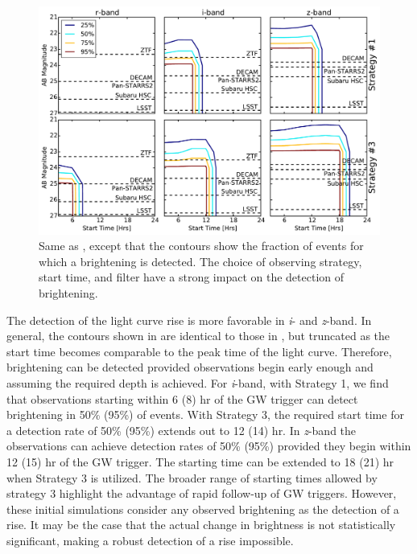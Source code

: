 \begin{figure}[t!]
\centering
\includegraphics[width=\textwidth]{./figs/chapter2/f5.pdf}
\caption{\singlespace Same as , except that the contours show the fraction of events for which a brightening is detected. The choice of observing strategy, start time, and filter have a strong impact on the detection of brightening.}
\label{fig:ch2_rise}
\end{figure}

The detection of the light curve rise is more favorable in {\em i}- and {\em z}-band. In general, the contours shown in  are identical to those in , but truncated as the start time becomes comparable to the peak time of the light curve. Therefore, brightening can be detected provided observations begin early enough and assuming the required depth is achieved. For {\em i}-band, with Strategy 1, we find that observations starting within 6 (8) hr of the GW trigger can detect brightening in 50\% (95\%) of events. With Strategy 3, the required start time for a detection rate of 50\% (95\%) extends out to 12 (14) hr. In {\em z}-band the observations can achieve detection rates of 50\% (95\%) provided they begin within 12 (15) hr of the GW trigger. The starting time can be extended to 18 (21) hr when Strategy 3 is utilized. The broader range of starting times allowed by strategy 3 highlight the advantage of rapid follow-up of GW triggers. However, these initial simulations consider any observed brightening as the detection of a rise. It may be the case that the actual change in brightness is not statistically significant, making a robust detection of a rise impossible. 

